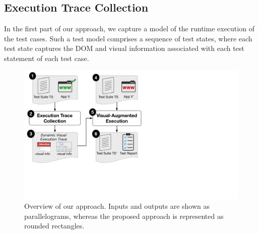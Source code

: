 \subsection{Execution Trace Collection}
%
In the first part of our approach, we capture a model of the  runtime execution of the test cases. 
Such a test model comprises a sequence of test states, where each test state captures the DOM and visual information associated with each test statement of each test case. 

\begin{figure}[t]
\centering
\includegraphics[trim={0.2cm 6.5cm 17cm 0.2cm},clip,scale=0.28]{images/approach-bigger}
\caption{Overview of our approach. Inputs and outputs are shown as parallelograms, whereas the proposed approach is represented as rounded rectangles.}
\label{approach}
\end{figure}




